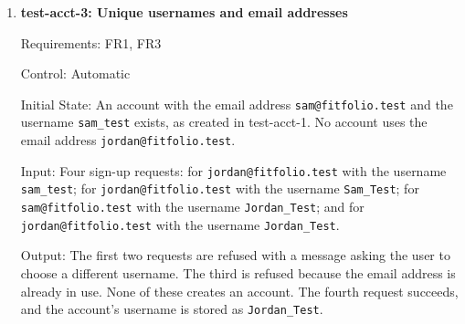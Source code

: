\documentclass[12pt, titlepage]{article}
\begin{document}
\begin{enumerate}
Output: Both requests are refused, and signing in with either email address
fails because no account exists. On the device, no account is created for
\texttt{young3@fitfolio.test}, and the screen shows that the age
confirmation is required.

Test Case Derivation: FR2 (Hazard Analysis, SEC-37) creates no account until
the user confirms they are at least \texttt{MIN\_USER\_AGE} (18) years old.
Each case uses its own email address, so that an account existing afterwards
shows which case failed. The two requests check the backend: a confirmation
set to false must be refused, and so must a request with no confirmation at
all, since a backend that only checked for false would treat a missing value
as confirmed. The backend is tested directly because a modified app could
skip the check on the sign-up screen (Hazard Analysis, H43). The device case
checks that the sign-up screen enforces the confirmation too and tells the
user why. It needs only one case, because the screen always sends a value.

How test will be performed: A pytest test sends the two requests and then
tries to sign in with each address. The tester then tries the sign-up screen
on a test device and records whether an account was created.

\item{\textbf{test-acct-3: Unique usernames and email addresses}\\}

Requirements: FR1, FR3

Control: Automatic

Initial State: An account with the email address \texttt{sam@fitfolio.test} and
the username \texttt{sam\_test} exists, as created in test-acct-1. No account
uses the email address \texttt{jordan@fitfolio.test}.

Input: Four sign-up requests: for \texttt{jordan@fitfolio.test} with the
username \texttt{sam\_test}; for \texttt{jordan@fitfolio.test} with the username
\texttt{Sam\_Test}; for \texttt{sam@fitfolio.test} with the username
\texttt{Jordan\_Test}; and for \texttt{jordan@fitfolio.test} with the username
\texttt{Jordan\_Test}.

Output: The first two requests are refused with a message asking the user to
choose a different username. The third is refused because the email address is
already in use. None of these creates an account. The fourth request succeeds,
and the account's username is stored as \texttt{Jordan\_Test}.


\end{enumerate}
\end{document}
